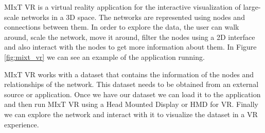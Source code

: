 %
%



MIxT VR is a virtual reality application for the interactive visualization of large-scale networks in a 3D space. The networks are represented using nodes and connections between them. In order to explore the data, the user can walk around, scale the network, move it around, filter the nodes using a 2D interface and also interact with the nodes to get more information about them. In Figure \ref{fig:mixt_vr} we can see an example of the application running.

MIxT VR works with a dataset that contains the information of the nodes and relationships of the network. This dataset needs to be obtained from an external source or application. Once we have our dataset we can load it to the application and then run MIxT VR using a Head Mounted Display or HMD for VR. Finally we can explore the network and interact with it to visualize the dataset in a VR experience.

